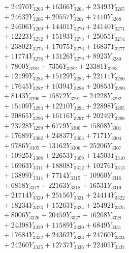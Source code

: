 \documentclass[a4paper,10pt]{article}
\begin{document}
{\begin{align}
&\;  + 24970 Y_{3263} + 16366 Y_{3264} + 23493 Y_{3265} \\[0.3ex]
&\;  + 24632 Y_{3266} + 20557 Y_{3267} + 7410 Y_{3268} \\[0.5ex]\allowbreak
&\;  + 24606 Y_{3269} + 14401 Y_{3270} + 24140 Y_{3271} \\[0.3ex]
&\;  + 12223 Y_{3272} + 15193 Y_{3273} + 25055 Y_{3274} \\[0.3ex]
&\;  + 23802 Y_{3275} + 17075 Y_{3276} + 16837 Y_{3277} \\[0.3ex]
&\;  + 11774 Y_{3278} + 13126 Y_{3279} + 8923 Y_{3280} \\[0.3ex]
&\;  + 7800 Y_{3281} + 7356 Y_{3282} + 23381 Y_{3283} \\[0.3ex]
&\;  + 12199 Y_{3284} + 15129 Y_{3285} + 22111 Y_{3286} \\[0.3ex]
&\;  + 17645 Y_{3287} + 10394 Y_{3288} + 20853 Y_{3289} \\[0.3ex]
&\;  + 8143 Y_{3290} + 15872 Y_{3291} + 24228 Y_{3292} \\[0.3ex]
&\;  + 15109 Y_{3293} + 12210 Y_{3294} + 22898 Y_{3295} \\[0.3ex]
&\;  + 20865 Y_{3296} + 16116 Y_{3297} + 20249 Y_{3298} \\[0.5ex]\allowbreak
&\;  + 23728 Y_{3299} + 6779 Y_{3300} + 15808 Y_{3301} \\[0.3ex]
&\;  + 17689 Y_{3302} + 24837 Y_{3303} + 7171 Y_{3304} \\[0.3ex]
&\;  + 9786 Y_{3305} + 13162 Y_{3306} + 25206 Y_{3307} \\[0.3ex]
&\;  + 10925 Y_{3308} + 22653 Y_{3309} + 14503 Y_{3310} \\[0.3ex]
&\;  + 16963 Y_{3311} + 18808 Y_{3312} + 10276 Y_{3313} \\[0.3ex]
&\;  + 13899 Y_{3314} + 7714 Y_{3315} + 10960 Y_{3316} \\[0.3ex]
&\;  + 6818 Y_{3317} + 22163 Y_{3318} + 16531 Y_{3319} \\[0.3ex]
&\;  + 21714 Y_{3320} + 25156 Y_{3321} + 24414 Y_{3322} \\[0.3ex]
&\;  + 18234 Y_{3323} + 15263 Y_{3324} + 25492 Y_{3325} \\[0.3ex]
&\;  + 8006 Y_{3326} + 20459 Y_{3327} + 16268 Y_{3328} \\[0.5ex]\allowbreak
&\;  + 24398 Y_{3329} + 11589 Y_{3330} + 6849 Y_{3331} \\[0.3ex]
&\;  + 17684 Y_{3332} + 24362 Y_{3333} + 24760 Y_{3334} \\[0.3ex]
&\;  + 24260 Y_{3335} + 12737 Y_{3336} + 22405 Y_{3337} \\[0.3ex]

\end{align}}
\end{document}
